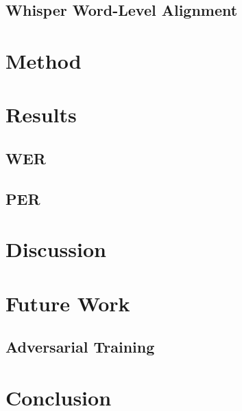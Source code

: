 \documentclass[12pt]{article}
\begin{document}
\begin{multicols*}{2}
\subsection{Whisper Word-Level Alignment}

\section{Method}

\section{Results}

\subsection{WER}

\subsection{PER}

\section{Discussion}

\section{Future Work}
\subsection{Adversarial Training}

\section{Conclusion}


\end{multicols*}
\end{document}
